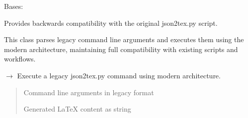 \documentclass[letterpaper,10pt,english]{sphinxmanual}
\begin{document}
\begin{fulllineitems}
\label{\detokenize{api/cli:src.cli.compat.LegacyCompatLayer}}
\pysigstartsignatures
\pysigline
{}
\pysigstopsignatures
\sphinxAtStartPar
Bases: 

\sphinxAtStartPar
Provides backwards compatibility with the original json2tex.py script.

\sphinxAtStartPar
This class parses legacy command line arguments and executes them using
the modern architecture, maintaining full compatibility with existing
scripts and workflows.

\begin{fulllineitems}
\label{\detokenize{api/cli:src.cli.compat.LegacyCompatLayer.__init__}}
\pysigstartsignatures
\pysiglinewithargsret
{}
{}
{}
\pysigstopsignatures
\end{fulllineitems}


\begin{fulllineitems}
\label{\detokenize{api/cli:src.cli.compat.LegacyCompatLayer.execute_legacy_command}}
\pysigstartsignatures
\pysiglinewithargsret
{}
{}
{{ $\rightarrow$ }}
\pysigstopsignatures
\sphinxAtStartPar
Execute a legacy json2tex.py command using modern architecture.
\begin{quote}\begin{description}
\sphinxAtStartPar
{} \textendash{} Command line arguments in legacy format

\sphinxAtStartPar
Generated LaTeX content as string

\end{description}\end{quote}

\end{fulllineitems}


\end{fulllineitems}
\end{document}
